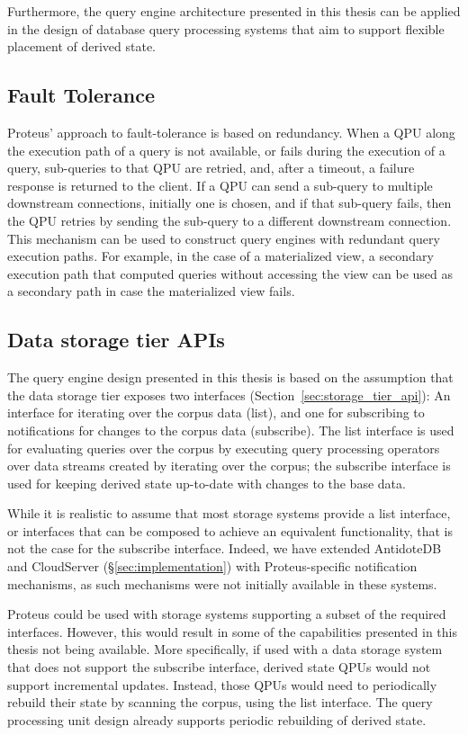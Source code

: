 Furthermore, the query engine architecture presented in this thesis can be applied in the design of database query processing
systems that aim to support flexible placement of derived state.

\subsection{Fault Tolerance}

Proteus' approach to fault-tolerance is based on redundancy.
When a QPU along the execution path of a query is not available, or fails during the execution of a query,
sub-queries to that QPU are retried, and, after a timeout, a failure response is returned to the client.
If a QPU can send a sub-query to multiple downstream connections, initially one is chosen,
and if that sub-query fails, then the QPU retries by sending the sub-query to a different downstream connection.
This mechanism can be used to construct query engines with redundant query execution paths.
For example, in the case of a materialized view, a secondary execution path that computed queries without accessing
the view can be used as a secondary path in case the materialized view fails.

\subsection{Data storage tier APIs}

The query engine design presented in this thesis is based on the assumption that the data storage tier exposes
two interfaces (Section~\ref{sec:storage_tier_api}):
An interface for iterating over the corpus data (list), and one for subscribing to notifications for changes to the
corpus data (subscribe).
The list interface is used for evaluating queries over the corpus by executing query processing operators over data streams
created by iterating over the corpus;
the subscribe interface is used for keeping derived state up-to-date with changes to the base data.

While it is realistic to assume that most storage systems provide a list interface,
or interfaces that can be composed to achieve an equivalent functionality,
that is not the case for the subscribe interface.
Indeed, we have extended AntidoteDB and CloudServer (\S\ref{sec:implementation}) with Proteus-specific
notification mechanisms,
as such mechanisms were not initially available in these systems.

Proteus could be used with storage systems supporting a subset of the required interfaces.
However, this would result in some of the capabilities presented in this thesis not being available.
More specifically, if used with a data storage system that does not support the subscribe interface,
derived state QPUs would not support incremental updates.
Instead, those QPUs would need to periodically rebuild their state by scanning the corpus, using the list interface.
The query processing unit design already supports periodic rebuilding of derived state.

